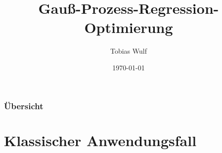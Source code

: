 \documentclass{beamer}
\title[GPR-Optimierung]{Gauß-Prozess-Regression-Optimierung} %
\author{Tobias Wulf} %
\institute[HAW] %
{
Hochschule für Angewandte Wissenschaften Hamburg \\ %
\medskip
\textit{tobias.wulf@haw-hamburg.de} %
}
\date{\today} %
\begin{document}
	
\graphicspath{ {./images}}

\begin{frame}
\titlepage %
\end{frame}

\begin{frame}
\frametitle{Übersicht} %
\tableofcontents %
\end{frame}

\section{Klassischer Anwendungsfall}
\end{document}

